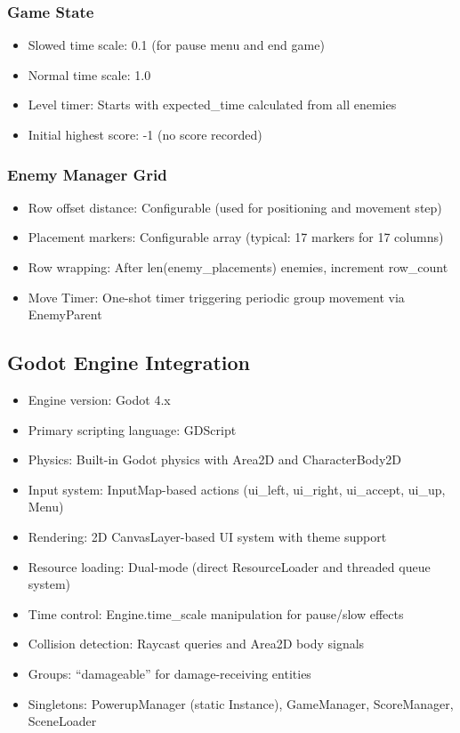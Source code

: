 \documentclass{article}
\begin{document}
\subsubsection{Game State}
\begin{itemize}
    \item Slowed time scale: 0.1 (for pause menu and end game)
    \item Normal time scale: 1.0
    \item Level timer: Starts with expected\_time calculated from all enemies
    \item Initial highest score: -1 (no score recorded)
\end{itemize}

\subsubsection{Enemy Manager Grid}
\begin{itemize}
    \item Row offset distance: Configurable (used for positioning and movement step)
    \item Placement markers: Configurable array (typical: 17 markers for 17 columns)
    \item Row wrapping: After len(enemy\_placements) enemies, increment row\_count
    \item Move Timer: One-shot timer triggering periodic group movement via EnemyParent
\end{itemize}

\subsection{Godot Engine Integration}

\begin{itemize}
    \item Engine version: Godot 4.x
    \item Primary scripting language: GDScript
    \item Physics: Built-in Godot physics with Area2D and CharacterBody2D
    \item Input system: InputMap-based actions (ui\_left, ui\_right, ui\_accept, ui\_up, Menu)
    \item Rendering: 2D CanvasLayer-based UI system with theme support
    \item Resource loading: Dual-mode (direct ResourceLoader and threaded queue system)
    \item Time control: Engine.time\_scale manipulation for pause/slow effects
    \item Collision detection: Raycast queries and Area2D body signals
    \item Groups: ``damageable'' for damage-receiving entities
    \item Singletons: PowerupManager (static Instance), GameManager, ScoreManager, SceneLoader
\end{itemize}
\end{document}
